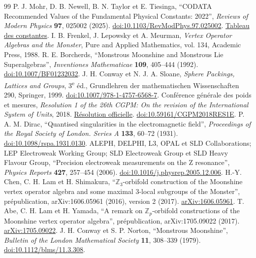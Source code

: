 \begin{thebibliography}{99}
 P. J. Mohr, D. B. Newell, B. N. Taylor et E. Tiesinga, ``CODATA Recommended Values of the Fundamental Physical Constants: 2022'', \emph{Reviews of Modern Physics} \textbf{97}, 025002 (2025). \href{https://doi.org/10.1103/RevModPhys.97.025002}{doi:10.1103/RevModPhys.97.025002}. \href{https://physics.nist.gov/cuu/Constants/Table/allascii.txt}{Tableau des constantes}.
 I. B. Frenkel, J. Lepowsky et A. Meurman, \emph{Vertex Operator Algebras and the Monster}, Pure and Applied Mathematics, vol. 134, Academic Press, 1988.
 R. E. Borcherds, ``Monstrous Moonshine and Monstrous Lie Superalgebras'', \emph{Inventiones Mathematicae} \textbf{109}, 405--444 (1992). \href{https://doi.org/10.1007/BF01232032}{doi:10.1007/BF01232032}.
 J. H. Conway et N. J. A. Sloane, \emph{Sphere Packings, Lattices and Groups}, 3\textsuperscript{e} éd., Grundlehren der mathematischen Wissenschaften 290, Springer, 1999. \href{https://doi.org/10.1007/978-1-4757-6568-7}{doi:10.1007/978-1-4757-6568-7}.
 Conférence générale des poids et mesures, \emph{Resolution 1 of the 26th CGPM: On the revision of the International System of Units}, 2018. \href{https://www.bipm.org/en/committees/cg/cgpm/26-2018/resolution-1}{Résolution officielle}. \href{https://doi.org/10.59161/CGPM2018RES1E}{doi:10.59161/CGPM2018RES1E}.
 P. A. M. Dirac, ``Quantised singularities in the electromagnetic field'', \emph{Proceedings of the Royal Society of London. Series A} \textbf{133}, 60--72 (1931). \href{https://doi.org/10.1098/rspa.1931.0130}{doi:10.1098/rspa.1931.0130}.
 ALEPH, DELPHI, L3, OPAL et SLD Collaborations; LEP Electroweak Working Group; SLD Electroweak Group et SLD Heavy Flavour Group, ``Precision electroweak measurements on the Z resonance'', \emph{Physics Reports} \textbf{427}, 257--454 (2006). \href{https://doi.org/10.1016/j.physrep.2005.12.006}{doi:10.1016/j.physrep.2005.12.006}.
 H.-Y. Chen, C. H. Lam et H. Shimakura, ``\(\mathbb Z_3\)-orbifold construction of the Moonshine vertex operator algebra and some maximal \(3\)-local subgroups of the Monster'', prépublication, arXiv:1606.05961 (2016), version 2 (2017). \href{https://arxiv.org/abs/1606.05961}{arXiv:1606.05961}.
 T. Abe, C. H. Lam et H. Yamada, ``A remark on \(\mathbb Z_p\)-orbifold constructions of the Moonshine vertex operator algebra'', prépublication, arXiv:1705.09022 (2017). \href{https://arxiv.org/abs/1705.09022}{arXiv:1705.09022}.
 J. H. Conway et S. P. Norton, ``Monstrous Moonshine'', \emph{Bulletin of the London Mathematical Society} \textbf{11}, 308--339 (1979). \href{https://doi.org/10.1112/blms/11.3.308}{doi:10.1112/blms/11.3.308}.
\end{thebibliography}
